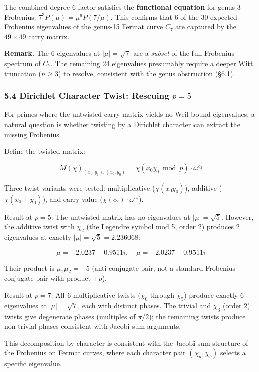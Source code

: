 \documentclass[
  11pt,
]{article}
\begin{document}
The combined degree-6 factor satisfies the \textbf{functional equation} for
genus-3 Frobenius: \(7^3 P(\mu) = \mu^6 P(7/\mu)\). This confirms that 6 of the
30 expected Frobenius eigenvalues of the genus-15 Fermat curve \(C_7\) are
captured by the \(49 \times 49\) carry matrix.

\textbf{Remark.} The 6 eigenvalues at \(\lvert\mu\rvert = \sqrt{7}\) are a
\emph{subset} of the full Frobenius spectrum of \(C_7\). The remaining 24
eigenvalues presumably require a deeper Witt truncation (\(n \geq 3\)) to
resolve, consistent with the genus obstruction (§6.1).

\subsubsection{\texorpdfstring{5.4 Dirichlet Character Twist: Rescuing
\(p = 5\)}{5.4 Dirichlet Character Twist: Rescuing p = 5}}\label{dirichlet-character-twist-rescuing-p-5}

For primes where the untwisted carry matrix yields no Weil-bound eigenvalues, a
natural question is whether twisting by a Dirichlet character can extract the
missing Frobenius.

Define the twisted matrix:

\[M(\chi)_{(x_1,y_1),(x_0,y_0)} = \chi(x_0 y_0 \bmod p) \cdot \omega^{c_2}\]

Three twist variants were tested: multiplicative (\(\chi(x_0 y_0)\)), additive
(\(\chi(x_0 + y_0)\)), and carry-value (\(\chi(c_2) \cdot \omega^{c_2}\)).

Result at \(p = 5\): The untwisted matrix has no eigenvalues at
\(\lvert\mu\rvert = \sqrt{5}\). However, the additive twist with \(\chi_2\) (the
Legendre symbol mod 5, order 2) produces 2 eigenvalues at exactly
\(\lvert\mu\rvert = \sqrt{5} = 2.236068\):

\[\mu = +2.0237 - 0.9511i, \quad \mu = -2.0237 - 0.9511i\]

Their product is \(\mu_1 \mu_2 = -5\) (anti-conjugate pair, not a standard
Frobenius conjugate pair with product \(+p\)).

Result at \(p = 7\): All 6 multiplicative twists (\(\chi_0\) through \(\chi_5\))
produce exactly 6 eigenvalues at \(\lvert\mu\rvert = \sqrt{7}\), each with
distinct phases. The trivial and \(\chi_3\) (order 2) twists give degenerate
phases (multiples of \(\pi/2\)); the remaining twists produce non-trivial phases
consistent with Jacobi sum arguments.

This decomposition by character is consistent with the Jacobi sum structure of
the Frobenius on Fermat curves, where each character pair \((\chi_a, \chi_b)\)
selects a specific eigenvalue.
\end{document}

